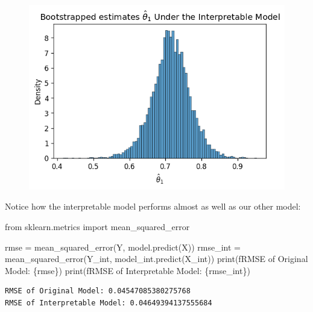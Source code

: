 \documentclass[
  letterpaper,
  DIV=11,
  numbers=noendperiod]{scrreprt}
\newenvironment{Shaded}{\begin{snugshade}}{\end{snugshade}}
\newcommand{\BuiltInTok}[1]{\textcolor[rgb]{0.00,0.23,0.31}{#1}}
\newcommand{\ImportTok}[1]{\textcolor[rgb]{0.00,0.46,0.62}{#1}}
\newcommand{\NormalTok}[1]{\textcolor[rgb]{0.00,0.23,0.31}{#1}}
\newcommand{\OperatorTok}[1]{\textcolor[rgb]{0.37,0.37,0.37}{#1}}
\newcommand{\SpecialCharTok}[1]{\textcolor[rgb]{0.37,0.37,0.37}{#1}}
\newcommand{\SpecialStringTok}[1]{\textcolor[rgb]{0.13,0.47,0.30}{#1}}
\begin{document}
\begin{figure}[H]

{\centering \includegraphics{inference_causality/inference_causality_files/figure-pdf/cell-10-output-1.png}

}

\end{figure}

Notice how the interpretable model performs almost as well as our other
model:

\begin{Shaded}
\begin{Highlighting}[]
\ImportTok{from}\NormalTok{ sklearn.metrics }\ImportTok{import}\NormalTok{ mean\_squared\_error}

\NormalTok{rmse }\OperatorTok{=}\NormalTok{ mean\_squared\_error(Y, model.predict(X))}
\NormalTok{rmse\_int }\OperatorTok{=}\NormalTok{ mean\_squared\_error(Y\_int, model\_int.predict(X\_int))}
\BuiltInTok{print}\NormalTok{(}\SpecialStringTok{f\textquotesingle{}RMSE of Original Model: }\SpecialCharTok{\{}\NormalTok{rmse}\SpecialCharTok{\}}\SpecialStringTok{\textquotesingle{}}\NormalTok{)}
\BuiltInTok{print}\NormalTok{(}\SpecialStringTok{f\textquotesingle{}RMSE of Interpretable Model: }\SpecialCharTok{\{}\NormalTok{rmse\_int}\SpecialCharTok{\}}\SpecialStringTok{\textquotesingle{}}\NormalTok{)}
\end{Highlighting}
\end{Shaded}

\begin{verbatim}
RMSE of Original Model: 0.04547085380275768
RMSE of Interpretable Model: 0.04649394137555684
\end{verbatim}
\end{document}
